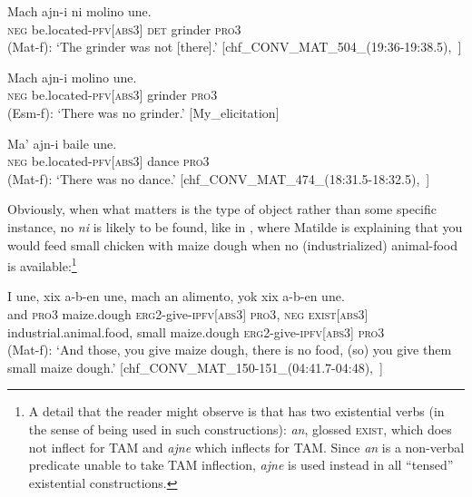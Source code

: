 \documentclass[output=paper
,modfonts
,nonflat]{langsci/langscibook}
\begin{document}
\ea \label{ex:pico:57}

\ea \label{ex:pico:57a}
\gll Mach ajn-i ni molino une. \\
\textsc{neg} be.located-{\textsc{pfv[abs3]}} \textsc{det} grinder {\textsc{pro3}}\\
\glt (Mat-f): `The grinder was not [there].' [chf\_CONV\_MAT\_504\_(19:36-19:38.5),~\citealt{Delgado-Galvan2018archive}]

\ex \label{ex:pico:57b}
\gll Mach ajn-i molino une.\\
\textsc{neg} be.located-{\textsc{pfv[abs3]}} grinder {\textsc{pro3}}\\
\glt (Esm-f): `There was no grinder.' [My\_elicitation]

\ex \label{ex:pico:57c}
\gll Ma' ajn-i baile une.
\\
\textsc{neg} be.located-{\textsc{pfv[abs3]}} dance {\textsc{pro3}}\\
\glt (Mat-f): `There was no dance.' [chf\_CONV\_MAT\_474\_(18:31.5-18:32.5),~\citealt{Delgado-Galvan2018archive}]
\z
\z

Obviously, when what matters is the type of object rather than some specific instance, no \textit{ni} is likely to be found, like in , where Matilde is explaining that you would feed small chicken with maize dough when no (industrialized) animal-food is available:{\footnote{A detail that the reader might observe is that  has two existential verbs (in the sense of being used in such constructions): \textit{an}, glossed \textsc{exist}, which does not inflect for TAM and \textit{ajne} which inflects for TAM. Since \textit{an} is a non-verbal predicate unable to take TAM inflection, \textit{ajne} is used instead in all ``tensed'' existential constructions.}}

\ea \label{ex:pico:58}

\gll I une, xix a-b-en une, mach an alimento, yok xix a-b-en une.\\
and \textsc{pro3} maize.dough  \textsc{erg2}-give-\textsc{ipfv[abs3]} \textsc{pro3}, \textsc{neg} \textsc{exist[abs3]} industrial.animal.food, small maize.dough \textsc{erg2}-give-\textsc{ipfv[abs3]} \textsc{pro3} \\
\glt (Mat-f): `And those, you give maize dough, there is no food, (so) you give them small maize dough.' [chf\_CONV\_MAT\_150-151\_(04:41.7-04:48),~\citealt{Delgado-Galvan2018archive}]
\z
\end{document}
